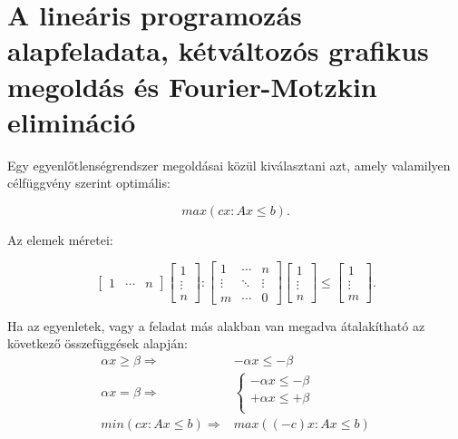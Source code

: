 \skiptooddpage
\section[A lineáris programozás alapfeladata]{A lineáris programozás
alapfeladata, kétváltozós grafikus megoldás és Fourier-Motzkin elimináció}

Egy egyenlőtlenségrendszer megoldásai közül kiválasztani azt, amely valamilyen
célfüggvény szerint optimális:

\begin{displaymath}
max(cx: Ax \leq b).
\end{displaymath}

Az elemek méretei: 

\begin{displaymath}
\begin{bmatrix} 1 &  \cdots &  n \end{bmatrix}
\begin{bmatrix} 1 \\ \vdots \\  n \end{bmatrix}
:
\begin{bmatrix} 1 & \cdots & n \\ \vdots & \ddots & \vdots \\ m  & \cdots & 0 \end{bmatrix}
\begin{bmatrix} 1 \\ \vdots \\  n \end{bmatrix}
\leq
\begin{bmatrix} 1 \\ \vdots \\  m \end{bmatrix}.
\end{displaymath}

Ha az egyenletek, vagy a feladat más alakban van megadva átalakítható az
következő összefüggések alapján:
\begin{align*}
\alpha x \geq \beta  \Rightarrow  &-\alpha x \leq -\beta \\
\alpha x  =    \beta \Rightarrow  & \begin{cases}
-\alpha x \leq-\beta \\
+\alpha x \leq+\beta \\
\end{cases}\\ 
min(cx:Ax \leq b)	 \Rightarrow    & max((-c)x:Ax \leq b)
\end{align*}

